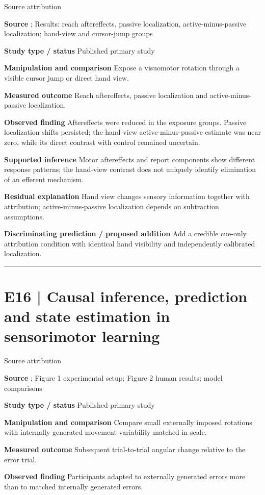 \documentclass[11pt,a4paper]{article}
\begin{document}
{\small\sffamily\color{navy} Source attribution}\par
\textbf{Source} \cite{external2020}; Results: reach aftereffects, passive localization, active-minus-passive localization; hand-view and cursor-jump groups\par
\textbf{Study type / status} Published primary study\par
\textbf{Manipulation and comparison} Expose a visuomotor rotation through a visible cursor jump or direct hand view.\par
\textbf{Measured outcome} Reach aftereffects, passive localization and active-minus-passive localization.\par
\textbf{Observed finding} Aftereffects were reduced in the exposure groups. Passive localization shifts persisted; the hand-view active-minus-passive estimate was near zero, while its direct contrast with control remained uncertain.\par
\textbf{Supported inference} Motor aftereffects and report components show different response patterns; the hand-view contrast does not uniquely identify elimination of an efferent mechanism.\par
\textbf{Residual explanation} Hand view changes sensory information together with attribution; active-minus-passive localization depends on subtraction assumptions.\par
\textbf{Discriminating prediction / proposed addition} Add a credible cue-only attribution condition with identical hand visibility and independently calibrated localization.\par
\bigskip\hrule\medskip\section{E16 | Causal inference, prediction and state estimation in sensorimotor learning}
{\small\sffamily\color{navy} Source attribution}\par
\textbf{Source} \cite{piece2025}; Figure 1 experimental setup; Figure 2 human results; model comparisons\par
\textbf{Study type / status} Published primary study\par
\textbf{Manipulation and comparison} Compare small externally imposed rotations with internally generated movement variability matched in scale.\par
\textbf{Measured outcome} Subsequent trial-to-trial angular change relative to the error trial.\par
\textbf{Observed finding} Participants adapted to externally generated errors more than to matched internally generated errors.\par
\end{document}
